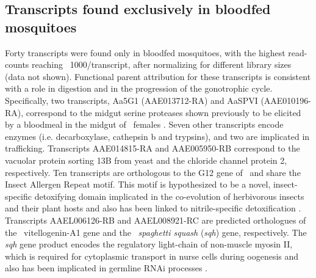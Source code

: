 \subsection{Transcripts found exclusively in bloodfed mosquitoes}
Forty transcripts were found only in bloodfed mosquitoes, with the highest read-counts reaching ~1000/transcript, after normalizing for different library sizes (data not shown). Functional parent attribution for these transcripts is consistent with a role in digestion and in the progression of the gonotrophic cycle. Specifically, two transcripts, Aa5G1 (AAE013712-RA) and AaSPVI (AAE010196-RA), correspond to the midgut serine proteases shown previously to be elicited by a bloodmeal in the midgut of \Aa\  females \cite{Brackney2010}. Seven other transcripts encode enzymes (i.e. decarboxylase, cathepsin b and trypsins), and two are implicated in trafficking. Transcripts AAE014815-RA and AAE005950-RB correspond to the vacuolar protein sorting 13B from yeast and the chloride channel protein 2, respectively. Ten transcripts are orthologous to the G12 gene of \Ag\ and share the Insect Allergen Repeat motif. This motif is hypothesized to be a novel, insect-specific detoxifying domain implicated in the co-evolution of herbivorous insects and their plant hosts and also has been linked to nitrile-specific detoxification \cite{Fischer2008}. Transcripts AAEL006126-RB and AAEL008921-RC are predicted orthologues of the \Cxq\ vitellogenin-A1 gene and the \Dmel\ \textit{spaghetti squash} (\textit{sqh}) gene, respectively. The \textit{sqh} gene product encodes the regulatory light-chain of non-muscle myosin II, which is required for cytoplasmic transport in nurse cells during oogenesis and also has been implicated in germline \gls{RNAi} processes \cite{Pane2007}.


